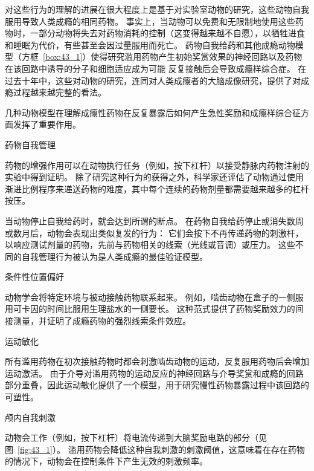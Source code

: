 对这些行为的理解的进展在很大程度上是基于对实验室动物的研究，这些动物自我服用导致人类成瘾的相同药物。
事实上，当动物可以免费和无限制地使用这些药物时，一部分动物将失去对药物消耗的控制（这变得越来越不自愿），以牺牲进食和睡眠为代价，有些甚至会因过量服用而死亡。
药物自我给药和其他成瘾动物模型（方框~\ref{box:43_1}）使得研究滥用药物产生初始奖赏效果的神经回路以及药物在该回路中诱导的分子和细胞适应成为可能 反复接触后会导致成瘾样综合症。
在过去十年中，这些对动物的研究，连同对人类成瘾者的大脑成像研究，提供了对成瘾过程越来越完整的看法。


\begin{proposition}[药物成瘾的动物模型] \label{box:43_1}
	
	\quad \quad 几种动物模型在理解成瘾性药物在反复暴露后如何产生急性奖励和成瘾样综合征方面发挥了重要作用。
	
	\quad \quad 药物自我管理
	
	\quad \quad 药物的增强作用可以在动物执行任务（例如，按下杠杆）以接受静脉内药物注射的实验中得到证明。
	除了研究这种行为的获得之外，科学家还评估了动物通过使用渐进比例程序来递送药物的难度，其中每个连续的药物剂量都需要越来越多的杠杆按压。
	
	\quad \quad 当动物停止自我给药时，就会达到所谓的断点。
	在药物自我给药停止或消失数周或数月后，动物会表现出类似复发的行为：
	它们会按下不再传递药物的刺激杆，以响应测试剂量的药物，先前与药物相关的线索（光线或音调）或压力。
	这些不同的自我管理行为被认为是人类成瘾的最佳验证模型。
	
	\quad \quad 条件性位置偏好
	
	\quad \quad 动物学会将特定环境与被动接触药物联系起来。
	例如，啮齿动物在盒子的一侧服用可卡因的时间比服用生理盐水的一侧要长。
	这种范式提供了药物奖励效力的间接测量，并证明了成瘾药物的强烈线索条件效应。
	
	\quad \quad 运动敏化
	
	\quad \quad 所有滥用药物在初次接触药物时都会刺激啮齿动物的运动，反复服用药物后会增加运动激活。
	由于介导对滥用药物的运动反应的神经回路与介导奖赏和成瘾的回路部分重叠，因此运动敏化提供了一个模型，用于研究慢性药物暴露过程中该回路的可塑性。
	
	\quad \quad 颅内自我刺激
	
	\quad \quad 动物会工作（例如，按下杠杆）将电流传递到大脑奖励电路的部分（见图~\ref{fig:43_1}）。
	滥用药物会降低这种自我刺激的刺激阈值，这意味着在存在药物的情况下，动物会在控制条件下产生无效的刺激频率。
	
\end{proposition}




